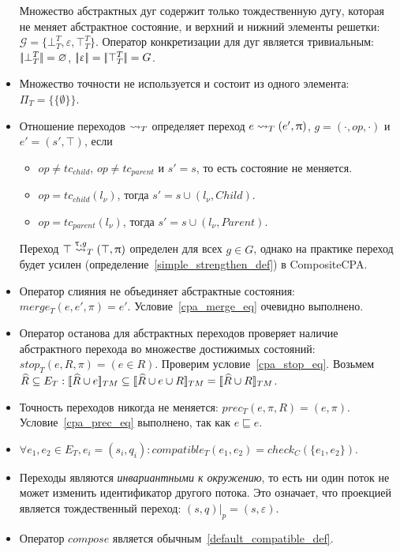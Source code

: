 \begin{itemize}
Множество абстрактных дуг содержит только тождественную дугу, которая не меняет абстрактное состояние, и верхний и нижний элементы решетки: $\mathcal{G} = \{\bot^T_T, \varepsilon, \top^T_T\}$.
Оператор конкретизации для дуг является тривиальным: $\lvert \! \lvert \bot^T_T \rvert \! \rvert = \varnothing$, $\lvert \! \lvert \upvarepsilon \rvert \! \rvert = \lvert \! \lvert \top^T_T \rvert \! \rvert = G$.

\item Множество точности не используется и состоит из одного элемента: $\Pi_T = \{\{\emptyset\}\}$.

\item Отношение переходов $\leadsto_T$ определяет переход $e \leadsto_T (e', \uppi)$, $g=(\cdot,op,\cdot)$ и $e' = (s', \top)$, если 
\begin{itemize}
\item $op\neq tc_{child}$, $op\neq tc_{parent}$ и $s' = s$, то есть состояние не меняется.
\item $op=tc_{child}(l_\nu)$, тогда $s' = s \cup (l_\nu, Child)$.
\item $op=tc_{parent}(l_\nu)$, тогда $s' = s \cup (l_\nu, Parent)$.
\end{itemize}

Переход $\top \stackrel{\uptau, g}{\leadsto}_T (\top, \uppi)$ определен для всех $g\in G$, однако на практике переход будет усилен (определение~\ref{simple_strengthen_def}) в CompositeCPA.

\item Оператор слияния не объединяет абстрактные состояния: $merge_T(e, e', \pi) = e'$. Условие~\ref{cpa_merge_eq} очевидно выполнено.

\item Оператор останова для абстрактных переходов проверяет наличие абстрактного перехода во множестве достижимых состояний: $stop_T(e, R, \pi) = (e \in R)$.
Проверим условие~\ref{cpa_stop_eq}.
Возьмем $\widehat{R} \subseteq E_T: [\![ \widehat{R} \cup e ]\!]_{TM} \subseteq [\![ \widehat{R} \cup e \cup R ]\!]_{TM} = [\![ \widehat{R} \cup R ]\!]_{TM}$.

\item Точность переходов никогда не меняется: $prec_T(e, \pi, R) = (e, \pi)$. Условие~\ref{cpa_prec_eq} выполнено, так как $e \sqsubseteq e$.

\item $\forall e_1, e_2 \in E_T, e_i = (s_i, q_i):compatible_T(e_1,e_2) = check_C(\{e_1, e_2\})$.

\item Переходы являются {\em инвариантными к окружению}, то есть ни один поток не может изменить идентификатор другого потока.
Это означает, что проекцией является тождественный переход:
$(s, q)|_p = (s, \varepsilon)$.

\item Оператор $compose$ является обычным~\ref{default_compatible_def}.
\end{itemize}

